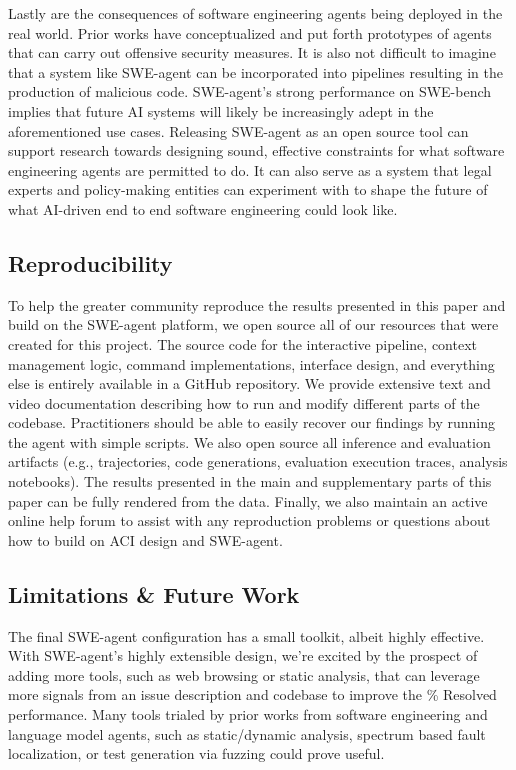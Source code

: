 Lastly are the consequences of software engineering agents being deployed in the real world.
Prior works have conceptualized and put forth prototypes of agents that can carry out offensive security measures.
It is also not difficult to imagine that a system like SWE-agent can be incorporated into pipelines resulting in the production of malicious code.
SWE-agent’s strong performance on SWE-bench implies that future AI systems will likely be increasingly adept in the aforementioned use cases.
Releasing SWE-agent as an open source tool can support research towards designing sound, effective constraints for what software engineering agents are permitted to do.
It can also serve as a system that legal experts and policy-making entities can experiment with to shape the future of what AI-driven end to end software engineering could look like.

\subsection{Reproducibility}
\label{appx:statement:reproducibility}
To help the greater community reproduce the results presented in this paper and build on the SWE-agent platform, we open source all of our resources that were created for this project.
The source code for the interactive pipeline, context management logic, command implementations, interface design, and everything else is entirely available in a GitHub repository.
We provide extensive text and video documentation describing how to run and modify different parts of the codebase.
Practitioners should be able to easily recover our findings by running the agent with simple scripts.
We also open source all inference and evaluation artifacts (e.g., trajectories, code generations, evaluation execution traces, analysis notebooks).
The results presented in the main and supplementary parts of this paper can be fully rendered from the data.
Finally, we also maintain an active online help forum to assist with any reproduction problems or questions about how to build on ACI design and SWE-agent.

\subsection{Limitations \& Future Work}
\label{appx:statement:limits}
The final SWE-agent configuration has a small toolkit, albeit highly effective.
With SWE-agent's highly extensible design, we're excited by the prospect of adding more tools, such as web browsing or static analysis, that can leverage more signals from an issue description and codebase to improve the \% Resolved performance.
Many tools trialed by prior works from software engineering and language model agents, such as static/dynamic analysis, spectrum based fault localization, or test generation via fuzzing could prove useful.

